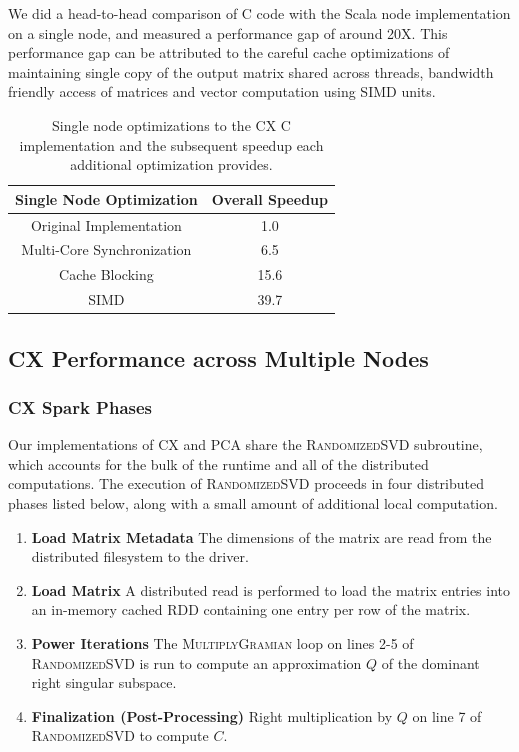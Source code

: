  We did a head-to-head comparison of C code with the Scala node
 implementation on a single node, and measured a performance gap of around
 20X.
 This performance gap can be attributed to the careful cache
 optimizations of maintaining single copy of the output matrix shared
 across threads, bandwidth friendly access of matrices and vector
 computation using SIMD units.
 
  \begin{table}
  \begin{center}
  \begin{tabular}{ |c|c| } 
  \hline
  Single Node Optimization & Overall Speedup\\
  \hline
  Original Implementation & 1.0  \\
  Multi-Core Synchronization & 6.5 \\
  Cache Blocking & 15.6 \\
  SIMD & 39.7 \\
  \hline

  \end{tabular}
  \end{center}
  \caption{Single node optimizations to the CX C implementation and
  the subsequent speedup  each additional optimization provides.}
  \label{tab:single_node}
  \end{table}
 



  \subsection{CX Performance across Multiple Nodes}

  \subsubsection{CX Spark Phases}
  Our implementations of CX and PCA share the \textsc{RandomizedSVD} subroutine, which accounts for the bulk of the runtime and all of the distributed computations.
  The execution of \textsc{RandomizedSVD} proceeds in four distributed phases listed below, along with a small amount of additional local computation.
  \begin{enumerate}
      \item \textbf{Load Matrix Metadata}
         The dimensions of the matrix are read from the distributed filesystem to the driver.
      \item \textbf{Load Matrix}
         A distributed read is performed to load the matrix entries into an in-memory cached
         RDD containing one entry per row of the matrix.
      \item \textbf{Power Iterations}
         The \textsc{MultiplyGramian} loop on lines 2-5 of
         \textsc{RandomizedSVD} is run to compute an approximation $Q$
         of the dominant right singular subspace.
       \item \textbf{Finalization (Post-Processing)}
         Right multiplication by $Q$ on line 7 of \textsc{RandomizedSVD} to compute $C$.
  \end{enumerate}

